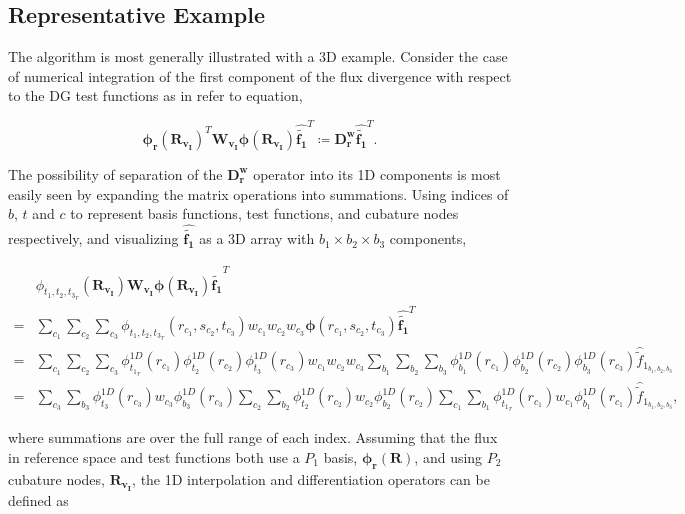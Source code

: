 \documentclass[12pt,Bold,letterpaper,TexShade]{mcgilletdclass}
\numberwithin{equation}{section}
\newcommand{\mat}[1]{\bm{{#1}}}
\newcommand{\vect}[1]{\bm{{#1}}}
\begin{document}
\subsection{Representative Example}
The algorithm is most generally illustrated with a 3D example. Consider the case of numerical integration of the first component of the flux divergence with respect to the DG test functions as in {\color{red} refer to equation},

\begin{equation} \nonumber
\vect{\phi_r}(\mat{R_{v_I}})^T \mat{W_{v_I}} \vect{\phi}(\mat{R_{v_I}}) \vect{\hat{\tilde{f_1}}}^T
\coloneqq
\mat{D^{w}_r} \vect{\hat{\tilde{f_1}}}^T.
\end{equation}

The possibility of separation of the $\mat{D^{w}_r}$ operator into its 1D components is most easily seen by expanding the matrix operations into summations. Using indices of $b$, $t$ and $c$ to represent basis functions, test functions, and cubature nodes respectively, and visualizing $\vect{\hat{\tilde{f_1}}}$ as a 3D array with $b_1 \times b_2 \times b_3$ components,

\begin{align} \label{eq:sf_summation}
& \phi_{{t_1,t_2,t_3}_r}(\mat{R_{v_I}}) \mat{W_{v_I}} \vect{\phi}(\mat{R_{v_I}}) \vect{\hat{\tilde{f_1}}}^T \nonumber \\
= &
\sum\limits_{c_1} \sum\limits_{c_2} \sum\limits_{c_3} 
\phi_{{t_1,t_2,t_3}_r}(r_{c_1},s_{c_2},t_{c_3})
w_{c_1} w_{c_2} w_{c_3}
\vect{\phi}(r_{c_1},s_{c_2},t_{c_3}) \vect{\hat{\tilde{f_1}}}^T \nonumber \\
= &
\sum\limits_{c_1} \sum\limits_{c_2} \sum\limits_{c_3}
\phi^{1D}_{{t_1}_r}(r_{c_1}) \phi^{1D}_{t_2}(r_{c_2}) \phi^{1D}_{t_3}(r_{c_3})
w_{c_1} w_{c_2} w_{c_3}
\sum\limits_{b_1} \sum\limits_{b_2} \sum\limits_{b_3}
\phi^{1D}_{b_1}(r_{c_1}) \phi^{1D}_{b_2}(r_{c_2}) \phi^{1D}_{b_3}(r_{c_3})
\hat{\tilde{f}}_{1_{b_1,b_2,b_3}} \nonumber \\
= &
\sum\limits_{c_3} \sum\limits_{b_3} \phi^{1D}_{t_3}(r_{c_3}) w_{c_3} \phi^{1D}_{b_3}(r_{c_3})
\sum\limits_{c_2} \sum\limits_{b_2} \phi^{1D}_{t_2}(r_{c_2}) w_{c_2} \phi^{1D}_{b_2}(r_{c_2}) 
\sum\limits_{c_1} \sum\limits_{b_1} \phi^{1D}_{{t_1}_r}(r_{c_1}) w_{c_1} \phi^{1D}_{b_1}(r_{c_1})
\hat{\tilde{f}}_{1_{b_1,b_2,b_3}},
\end{align}

where summations are over the full range of each index. Assuming that the flux in reference space and test functions both use a $P_1$ basis, $\vect{\phi_r}(\vect{R})$, and using $P_2$ cubature nodes, $\mat{R_{v_I}}$, the 1D interpolation and differentiation operators can be defined as
\end{document}
